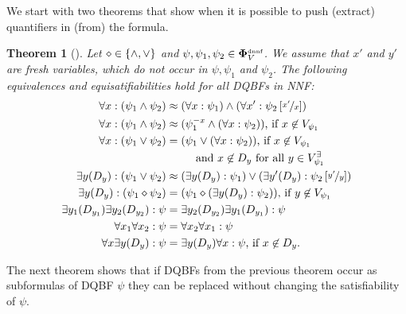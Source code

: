 \documentclass[
  digital, %
  twoside, %
  table,   %
  nolof,     %
  nolot,     %
]{fithesis3}
\let\setbuilder\set
\newcommand{\simpleset}[1]{\{{#1}\}}
\renewcommand{\set}[1]{\normalexpandarg\IfSubStr{#1}{|}{\setbuilder{#1}}{\simpleset{#1}}}
\newtheorem{theorem}{Theorem}[chapter] %
\theoremstyle{definition}
\theoremstyle{remark}
\newcommand{\substitute}[2]{\left[ \nicefrac{#2}{#1} \right]}
\newcommand{\DQBF}[1]{\mathbf{\Phi}_{#1}^{\text{\tiny dnnf}}}
\newcommand{\evars}[1]{V_{#1}^{\exists}}
\begin{document}
We start with two theorems that show when it is possible to push (extract) quantifiers in (from) the formula. %

\begin{theorem}[{\cite[Theorem 3,4]{HQSquantifierLocalization}}]
  Let ${\diamond} \in \set{{\land},{\lor}}$ and $\psi,\psi_1,\psi_2 \in \DQBF{V}$. We assume that $x'$ and $y'$ are fresh variables, which do not occur in $\psi,\psi_1$ and $\psi_2$. The following equivalences and equisatifiabilities hold for all DQBFs in NNF:
  \begin{align}
      \forall x : (\psi_1 \land \psi_2) &\approx (\forall x : \psi_1) \land (\forall x' : \psi_2\substitute{x}{x'}) \\
      \forall x : (\psi_1 \land \psi_2) &\approx (\psi_1^{-x} \land (\forall x : \psi_2)) \text{, if } x \not\in V_{\psi_1} \\
      \forall x : (\psi_1 \lor \psi_2) &= \begin{multlined}[t][3cm](\psi_1 \lor (\forall x : \psi_2)) \text{, if } x \not\in V_{\psi_1}\\
      \text{ and } x \not\in D_y \text{ for all } y \in \evars{\psi_1}\end{multlined} \\
      \exists y(D_y) : (\psi_1 \lor \psi_2) &\approx (\exists y(D_y) : \psi_1) \lor (\exists y'(D_y) : \psi_2\substitute{y}{y'}) \\
      \exists y(D_y) : (\psi_1 \diamond \psi_2) &= (\psi_1 \diamond (\exists y(D_y) : \psi_2)) \text{, if } y \not\in V_{\psi_1} \\
      \exists y_1(D_{y_1})\exists y_2(D_{y_2}) : \psi &= \exists y_2(D_{y_2}) \exists y_1(D_{y_1}) : \psi \\
      \forall x_1\forall x_2 : \psi &= \forall x_2\forall x_1 : \psi \\
      \forall x\exists y(D_y) : \psi &= \exists y(D_y)\forall x : \psi\text{, if } x \not\in D_y.
  \end{align}
\end{theorem}

The next theorem shows that if DQBFs from the previous theorem occur as subformulas of DQBF $\psi$ they can be replaced without changing the satisfiability of $\psi$.
\end{document}
